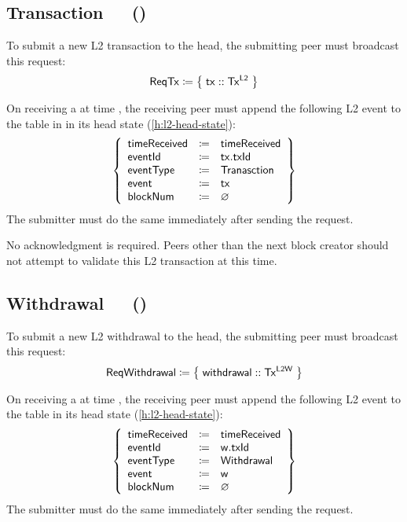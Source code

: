 \documentclass[../hydrozoa.tex]{subfiles}
\begin{document}
\subsection{Transaction~~~()}%
\label{h:l2-consensus-transaction}%

To submit a new L2 transaction to the head, the submitting peer must broadcast this request:
\begin{equation*}
  \mathsf{ReqTx} \coloneq \;\bigr\{\; \mathsf{tx} :: \mathsf{Tx^{L2}} \;\bigr\}
\end{equation*}

On receiving a  at time , the receiving peer must append the following L2 event to the  table in  in its head state (\cref{h:l2-head-state}):
\begin{equation*}
  \left\{
  \begin{array}{lll}
    \mathsf{timeReceived} &\coloneq& \mathsf{timeReceived} \\
    \mathsf{eventId} &\coloneq& \mathsf{tx.txId} \\
    \mathsf{eventType} &\coloneq& \mathsf{Tranasction} \\
    \mathsf{event} &\coloneq& \mathsf{tx} \\
    \mathsf{blockNum} &\coloneq& \varnothing
  \end{array}\right\}
\end{equation*}
The submitter must do the same immediately after sending the request.

No acknowledgment is required.
Peers other than the next block creator should not attempt to validate this L2 transaction at this time.

\subsection{Withdrawal~~~()}%
\label{h:l2-consensus-withdrawal}%

To submit a new L2 withdrawal to the head, the submitting peer must broadcast this request:
\begin{equation*}
  \mathsf{ReqWithdrawal} \coloneq \;\bigr\{\; \mathsf{withdrawal} :: \mathsf{Tx^{L2W}} \;\bigr\}
\end{equation*}

On receiving a  at time , the receiving peer must append the following L2 event to the  table in its head state (\cref{h:l2-head-state}):
\begin{equation*}
  \left\{
  \begin{array}{lll}
    \mathsf{timeReceived} &\coloneq& \mathsf{timeReceived} \\
    \mathsf{eventId} &\coloneq& \mathsf{w.txId} \\
    \mathsf{eventType} &\coloneq& \mathsf{Withdrawal} \\
    \mathsf{event} &\coloneq& \mathsf{w} \\
    \mathsf{blockNum} &\coloneq& \varnothing
  \end{array}\right\}
\end{equation*}
The submitter must do the same immediately after sending the request.
\end{document}

